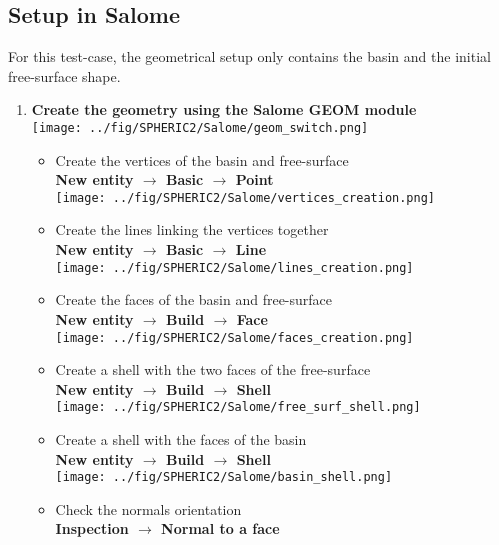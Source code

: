 \documentclass{../GPUSPHtemplate}
\begin{document}
\subsection{Setup in Salome}\label{sec:salome_spheric2}
For this test-case, the geometrical setup only contains the basin and the initial free-surface shape.
\begin{enumerate}
\item \textbf{Create the geometry using the Salome GEOM module}\smallskip\\
  \texttt{[image: ../fig/SPHERIC2/Salome/geom\_switch.png]}
  \begin{itemize}
  \item Create the vertices of the basin and free-surface\\
    \textbf{New entity $\to$ Basic $\to$ Point}\smallskip\\
    \texttt{[image: ../fig/SPHERIC2/Salome/vertices\_creation.png]}
  \item Create the lines linking the vertices together\\
    \textbf{New entity $\to$ Basic $\to$ Line}\smallskip\\
    \texttt{[image: ../fig/SPHERIC2/Salome/lines\_creation.png]}
  \item Create the faces of the basin and free-surface\\
    \textbf{New entity $\to$ Build $\to$ Face}\smallskip\\
    \texttt{[image: ../fig/SPHERIC2/Salome/faces\_creation.png]}
  \item Create a shell with the two faces of the free-surface\\
    \textbf{New entity $\to$ Build $\to$ Shell}\smallskip\\
    \texttt{[image: ../fig/SPHERIC2/Salome/free\_surf\_shell.png]}
  \item Create a shell with the faces of the basin\\
    \textbf{New entity $\to$ Build $\to$ Shell}\smallskip\\
    \texttt{[image: ../fig/SPHERIC2/Salome/basin\_shell.png]}
  \item Check the normals orientation\\
    \textbf{Inspection $\to$ Normal to a face}\smallskip\\

\end{itemize}
\end{enumerate}
\end{document}
